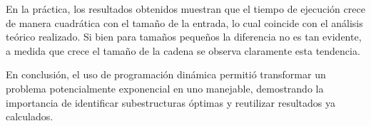 En la práctica, los resultados obtenidos muestran que el tiempo de ejecución crece de manera cuadrática con el tamaño de la entrada, 
lo cual coincide con el análisis teórico realizado. Si bien para tamaños pequeños la diferencia no es tan evidente, a medida que crece el tamaño de 
la cadena se observa claramente esta tendencia.

En conclusión, el uso de programación dinámica permitió transformar un problema potencialmente exponencial en uno manejable, 
demostrando la importancia de identificar subestructuras óptimas y reutilizar resultados ya calculados.

